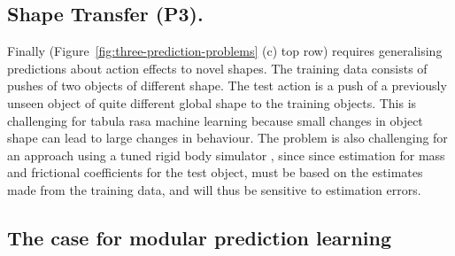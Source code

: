 \subsection{Shape Transfer (P3).} Finally (Figure~\ref{fig:three-prediction-problems} (c) top row) requires generalising predictions about action effects to novel shapes. The training data consists of pushes of two objects of different shape. The test action is a push of a previously unseen object of quite different global shape to the training objects. This is challenging for tabula rasa machine learning because small changes in object shape can lead to large changes in behaviour. The problem is also challenging for an approach using a tuned rigid body simulator , since since estimation for mass and frictional coefficients for the test object, must be based on the estimates made from the training data, and will thus be sensitive to estimation errors.

\subsection{The case for modular prediction learning}

